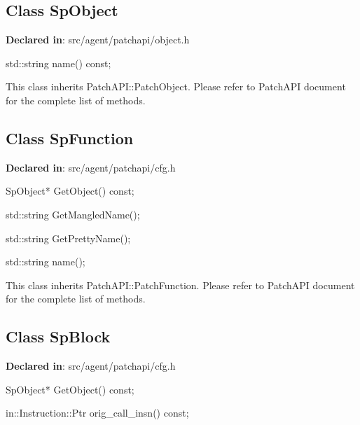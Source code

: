 \subsection{Class SpObject}
\textbf{Declared in}: src/agent/patchapi/object.h

\begin{apient}
std::string name() const;
\end{apient}

This class inherits PatchAPI::PatchObject. Please refer to PatchAPI document for
the complete list of methods.

\subsection{Class SpFunction}
\textbf{Declared in}: src/agent/patchapi/cfg.h

\begin{apient}
SpObject* GetObject() const;
\end{apient}


\begin{apient}
std::string GetMangledName();
\end{apient}

\begin{apient}
std::string GetPrettyName();
\end{apient}

\begin{apient}
std::string name();
\end{apient}

This class inherits PatchAPI::PatchFunction. Please refer to PatchAPI document
for the complete list of methods.

\subsection{Class SpBlock}
\textbf{Declared in}: src/agent/patchapi/cfg.h

\begin{apient}
SpObject* GetObject() const;
\end{apient}


\begin{apient}
in::Instruction::Ptr orig_call_insn() const;
\end{apient}

